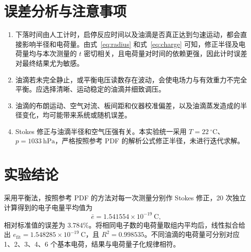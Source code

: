 \documentclass[UTF8,a4paper,12pt]{ctexart}
\begin{document}
\section{误差分析与注意事项}
\begin{enumerate}
  \item 下落时间由人工计时，启停反应时间以及油滴是否真正达到匀速运动，都会直接影响半径和电荷量。由式~\eqref{eq:radius} 和式~\eqref{eq:charge} 可知，修正半径及电荷量均与本次测量的 $t$ 密切相关，且电荷量对时间的依赖更强，因此计时误差对最终结果尤为敏感。
  \item 油滴若未完全静止，或平衡电压读数存在波动，会使电场力与有效重力不完全平衡。应选择清晰、运动稳定的油滴并细致调压。
  \item 油滴的布朗运动、空气对流、板间距和仪器校准偏差，以及油滴蒸发造成的半径变化，均可能带来系统或随机误差。
  \item Stokes 修正与油滴半径和空气压强有关。本实验统一采用 $T=22\ ^\circ\mathrm{C}$、$p=1033\ \mathrm{hPa}$，严格按照参考 PDF 的解析公式修正半径，未进行迭代求解。
\end{enumerate}

\section{实验结论}
采用平衡法，按照参考 PDF 的方法对每一次测量分别作 Stokes 修正，20 次独立计算得到的电子电量平均值为
\begin{equation}
  \boxed{\bar{e}=1.541554\times10^{-19}\ \mathrm{C}},
\end{equation}
相对标准值的误差为 $3.784\%$。将相同电子数的电荷量取组内平均后，线性拟合给出 $e_{\mathrm{fit}}=1.548285\times10^{-19}\ \mathrm{C}$，且 $R^2=0.998535$。不同油滴的电荷量可分别对应 1、2、3、4、6 个基本电荷，结果与电荷量子化规律相符。
\end{document}
